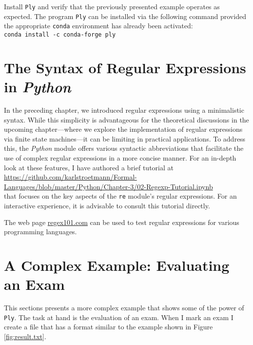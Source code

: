\homeworkEng
Install \texttt{Ply} and verify that the previously presented example operates as expected.
The program \texttt{Ply} can be installed via the following command provided the appropriate \texttt{conda}
environment has already been activated:
\\[0.2cm]
\hspace*{1.3cm}
\texttt{conda install -c conda-forge ply}
\pagebreak

\section{The Syntax of Regular Expressions in \textsl{Python}}
In the preceding chapter, we introduced regular expressions using a minimalistic syntax. While this simplicity
is advantageous for the theoretical discussions in the upcoming chapter---where we explore the implementation of
regular expressions via finite state machines---it can be limiting in practical applications. To address this,
the \textsl{Python} module  offers various syntactic abbreviations that facilitate the
use of complex regular expressions in a more concise manner. For an in-depth look at these features, I
have authored a brief tutorial at 
\\[0.2cm]
\hspace*{-1.3cm}
\href{https://github.com/karlstroetmann/Formal-Languages/blob/master/Python/Chapter-03/02-Regexp-Tutorial.ipynb}{https://github.com/karlstroetmann/Formal-Languages/blob/master/Python/Chapter-3/02-Regexp-Tutorial.ipynb}
\\[0.2cm]
that focuses on the key aspects of the \texttt{re} module's regular expressions. For an interactive experience,
it is advisable to consult this tutorial directly. 

The web page \href{https://regex101.com}{regex101.com} can be used to test regular expressions for
various programming languages. 

\section{A Complex Example: Evaluating an Exam}
This sections presents a more complex example that shows some of the power of \texttt{Ply}.  The
task at hand is the evaluation of an exam.  When I mark an exam I create a file that has a format
similar to the example shown in Figure \ref{fig:result.txt}. 

